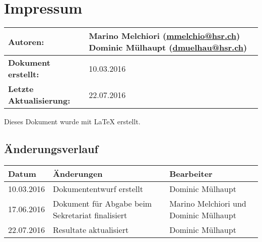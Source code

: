 \chapter*{Impressum}

\begin{table}[H] 
\centering 
\begin{tabular}{|p{0.35\twocelltabwidth}|p{0.65\twocelltabwidth}|}
\hline 
\textbf{Autoren:} & Marino Melchiori (\url{mmelchio@hsr.ch}) \newline
Dominic Mülhaupt (\url{dmuelhau@hsr.ch}) \\ 
\hline 
\textbf{Dokument erstellt:} & 10.03.2016 \\ 
\hline 
\textbf{Letzte Aktualisierung:} & 22.07.2016 \\ 
\hline 
\end{tabular}
\end{table}

Dieses Dokument wurde mit \LaTeX{} erstellt.

\section*{Änderungsverlauf}

\begin{longtable}{|p{0.15\threecelltabwidth}|p{0.60\threecelltabwidth}|p{0.25\threecelltabwidth}|}
\hline 
\textbf{Datum} & \textbf{Änderungen} & \textbf{Bearbeiter} \\ 
\hline 
10.03.2016 & Dokumententwurf erstellt & Dominic Mülhaupt \\ 
\hline 
17.06.2016 & Dokument für Abgabe beim Sekretariat finalisiert & Marino Melchiori und Dominic Mülhaupt \\ 
\hline 
22.07.2016 & Resultate aktualisiert & Dominic Mülhaupt \\ 
\hline 
\end{longtable} 